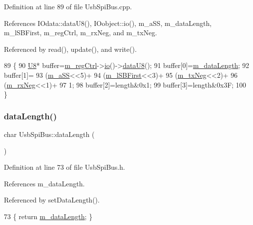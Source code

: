 Definition at line 89 of file Usb\+Spi\+Bus.\+cpp.



References I\+Odata\+::data\+U8(), I\+Oobject\+::io(), m\+\_\+a\+SS, m\+\_\+data\+Length, m\+\_\+l\+S\+B\+First, m\+\_\+reg\+Ctrl, m\+\_\+rx\+Neg, and m\+\_\+tx\+Neg.



Referenced by read(), update(), and write().


\begin{DoxyCode}
89                                 \{
90   \hyperlink{ICECALv3_8h_a3cb25ca6f51f003950f9625ff05536fc}{U8}* buffer=\hyperlink{classUsbSpiBus_abcd2ac59f2bb4ea5b97ff98f2b7659da}{m\_regCtrl}->\hyperlink{classIOobject_af04fb94137c3d86849f478ac5afab5d1}{io}()->\hyperlink{classIOdata_a75e9c318dbac3a39402179070943d4bc}{dataU8}();
91   buffer[0]=\hyperlink{classUsbSpiBus_a2d8b2bddd6d4d5dc53c38b5698737c5c}{m\_dataLength};
92   buffer[1]=
93     (\hyperlink{classUsbSpiBus_ac98d088ac8aed042f65cbd918fc538ae}{m\_aSS}<<5)+
94     (\hyperlink{classUsbSpiBus_a23011787b0425356b011bc7a1c7cff5b}{m\_lSBFirst}<<3)+
95     (\hyperlink{classUsbSpiBus_a48528e7dcb036ecc1732581a89e16d10}{m\_txNeg}<<2)+
96     (\hyperlink{classUsbSpiBus_abf36f2df24c3ec5363efe73c9771bbc8}{m\_rxNeg}<<1)+
97     1;
98   buffer[2]=length&0x1;
99   buffer[3]=length&0x3F;  
100 \}
\end{DoxyCode}
\mbox{\label{classUsbSpiBus_ae7d38b275b5267f795b2d9f1d561d688}} 
\subsubsection{\texorpdfstring{data\+Length()}{dataLength()}}
{\footnotesize\ttfamily char Usb\+Spi\+Bus\+::data\+Length (\begin{DoxyParamCaption}{ }\end{DoxyParamCaption})\hspace{0.3cm}{\ttfamily [inline]}}



Definition at line 73 of file Usb\+Spi\+Bus.\+h.



References m\+\_\+data\+Length.



Referenced by set\+Data\+Length().


\begin{DoxyCode}
73 \{ \textcolor{keywordflow}{return} \hyperlink{classUsbSpiBus_a2d8b2bddd6d4d5dc53c38b5698737c5c}{m\_dataLength}; \}
\end{DoxyCode}
\mbox{\label{classUsbSpiBus_a3543b3bbad0c137fde32fdc554a09a5d}} 
